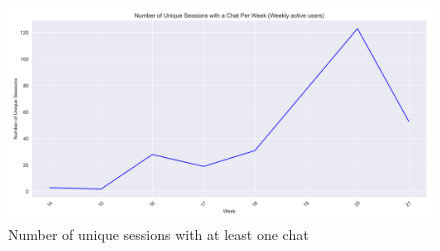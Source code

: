 \begin{figure}[H]
    \centering
    \includegraphics[width=\textwidth]{results/plots/assets/usage-11-number-of-unique-sessions-with-one-chat.png}
    \caption{Number of unique sessions with at least one chat}
    \label{fig:usage_11_number_of_unique_sessions_with_one_chat}
\end{figure}